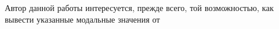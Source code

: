 \documentclass{article}
\begin{document}
Автор данной работы интересуется, прежде всего, той возможностью, как вывести указанные модальные значения от 










%
%
\end{document}
